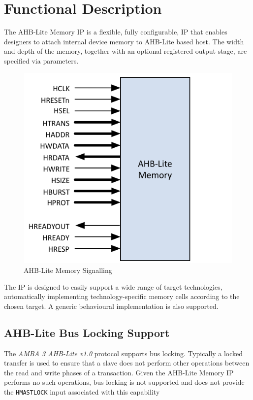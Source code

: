 \chapter{Functional Description} \label{functional-description}

The AHB-Lite Memory IP is a flexible, fully configurable, IP that enables designers to attach internal device memory to AHB-Lite based host. The width and depth of the memory, together with an optional registered output stage, are specified via parameters.

\begin{figure}[th]
	\centering
	\includegraphics{assets/img/AHB-Lite-Memory-PortDiag}
	\caption{AHB-Lite Memory Signalling}
	\label{fig:ahb-lite-memory-portdiag}
\end{figure}

The IP is designed to easily support a wide range of target
technologies, automatically implementing technology-specific memory
cells according to the chosen target. A generic behavioural
implementation is also supported.

\section{AHB-Lite Bus Locking Support} \label{ahb-lite-bus-locking-support}

The \emph{AMBA 3 AHB-Lite v1.0} protocol supports bus locking. Typically a locked transfer is used to ensure that a slave does not perform other operations between the read and write phases of a transaction. Given the AHB-Lite Memory IP performs no such operations, bus locking is not supported and does not provide the \texttt{HMASTLOCK} input associated with this capability
